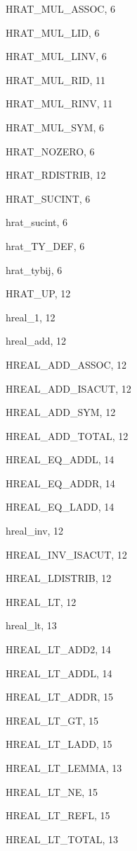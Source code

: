 \begin{theindex}
  \item {\ptt HRAT\_MUL\_ASSOC}, 6
  \item {\ptt HRAT\_MUL\_LID}, 6
  \item {\ptt HRAT\_MUL\_LINV}, 6
  \item {\ptt HRAT\_MUL\_RID}, 11
  \item {\ptt HRAT\_MUL\_RINV}, 11
  \item {\ptt HRAT\_MUL\_SYM}, 6
  \item {\ptt HRAT\_NOZERO}, 6
  \item {\ptt HRAT\_RDISTRIB}, 12
  \item {\ptt HRAT\_SUCINT}, 6
  \item {\ptt hrat\_sucint}, 6
  \item {\ptt hrat\_TY\_DEF}, 6
  \item {\ptt hrat\_tybij}, 6
  \item {\ptt HRAT\_UP}, 12
  \item {\ptt hreal\_1}, 12
  \item {\ptt hreal\_add}, 12
  \item {\ptt HREAL\_ADD\_ASSOC}, 12
  \item {\ptt HREAL\_ADD\_ISACUT}, 12
  \item {\ptt HREAL\_ADD\_SYM}, 12
  \item {\ptt HREAL\_ADD\_TOTAL}, 12
  \item {\ptt HREAL\_EQ\_ADDL}, 14
  \item {\ptt HREAL\_EQ\_ADDR}, 14
  \item {\ptt HREAL\_EQ\_LADD}, 14
  \item {\ptt hreal\_inv}, 12
  \item {\ptt HREAL\_INV\_ISACUT}, 12
  \item {\ptt HREAL\_LDISTRIB}, 12
  \item {\ptt HREAL\_LT}, 12
  \item {\ptt hreal\_lt}, 13
  \item {\ptt HREAL\_LT\_ADD2}, 14
  \item {\ptt HREAL\_LT\_ADDL}, 14
  \item {\ptt HREAL\_LT\_ADDR}, 15
  \item {\ptt HREAL\_LT\_GT}, 15
  \item {\ptt HREAL\_LT\_LADD}, 15
  \item {\ptt HREAL\_LT\_LEMMA}, 13
  \item {\ptt HREAL\_LT\_NE}, 15
  \item {\ptt HREAL\_LT\_REFL}, 15
  \item {\ptt HREAL\_LT\_TOTAL}, 13

\end{theindex}
